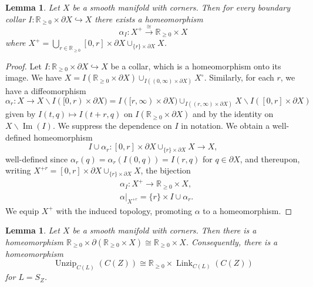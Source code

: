 \documentclass[]{amsart}
\newcommand{\mbb}[1]{\mathbb{#1}}
\newcommand{\R}{\mbb{R}}
\DeclareMathOperator{\Imm}{Im}
\DeclareMathOperator{\Unzip}{Unzip}
\DeclareMathOperator{\Link}{Link}
\numberwithin{equation}{section}
\theoremstyle{definition}
\theoremstyle{remark}
\theoremstyle{plain}
\newtheorem{lemma}[equation]{Lemma}
\begin{document}
\begin{lemma}\label{K52SWOM}
    Let $X$ be a smooth manifold with corners. Then for every boundary collar $I\colon \R_{\geq0}\times \partial X\hookrightarrow X$ there exists a homeomorphism
    \[
        \alpha_I\colon X^+\xrightarrow{\cong}\R_{\geq0}\times X
    \]
    where $X^+=\bigcup_{r\in\R_{\geq0}}[0,r]\times\partial X\cup_{\{r\}\times\partial X}X$.
\end{lemma}
\begin{proof}
    Let $I\colon\R_{\geq0}\times\partial X\hookrightarrow X$ be a collar, which is a homeomorphism onto its image. We have $X=I(\R_{\geq0}\times \partial X)\cup_{I((0,\infty)\times\partial X)}X^\circ$. Similarly, for each $r$, we have a diffeomorphism 
    \[
        \alpha_r\colon X\to X\smallsetminus I([0,r)\times\partial X)=I([r,\infty)\times\partial X)\cup_{I((r,\infty)\times\partial X)}X\smallsetminus I([0,r]\times\partial X)
    \]
    given by $I(t,q)\mapsto I(t+r,q)$ on $I(\R_{\geq0}\times\partial X)$ and by the identity on $X\smallsetminus \Imm(I)$. We suppress the dependence on $I$ in notation. We obtain a well-defined homeomorphism 
    \[
        I\cup\alpha_r\colon [0,r]\times\partial X\cup_{\{r\}\times \partial X}X\to X,
    \]
    well-defined since $\alpha_r(q)=\alpha_r(I(0,q))=I(r,q)$ for $q\in\partial X$, and thereupon, writing $X^{+r}=[0,r]\times\partial X\cup_{\{r\}\times \partial X}X$, the bijection 
    \begin{align*}
        &\alpha_I\colon X^+\to \R_{\geq0}\times X,\\
        &\alpha|_{X^{+r}}=\{r\}\times I\cup\alpha_r.
    \end{align*}
    We equip $X^+$ with the induced topology, promoting $\alpha$ to a homeomorphism.
\end{proof}


\begin{lemma}\label{DGSR46V}
    Let $X$ be a smooth manifold with corners. Then there is a homeomorphism $\R_{\geq0}\times \partial(\R_{\geq0}\times X)\cong\R_{\geq0} \times X$. Consequently, there is a homeomorphism
    \[
        \Unzip_{C(L)}(C(Z))\cong\R_{\geq0}\times\Link_{C(L)}(C(Z))
    \] 
    for $L=S_Z$.
\end{lemma}
\end{document}
